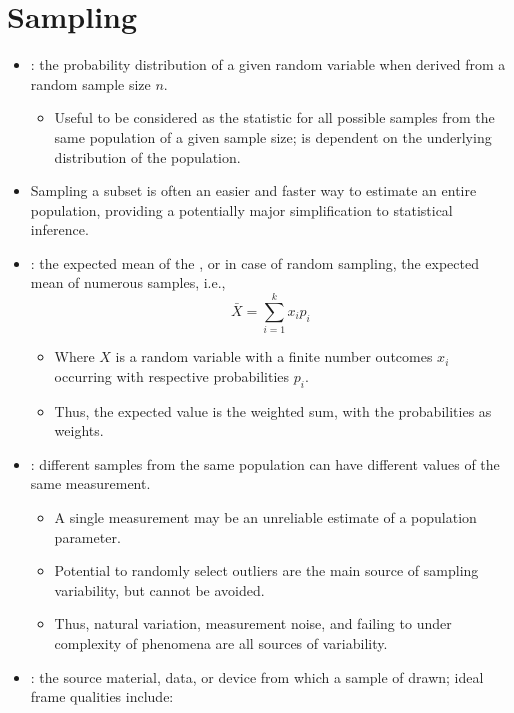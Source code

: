 \section{Sampling}
\begin{itemize}
  \item {}: the probability distribution of a given random variable when derived from a random sample size \(n\).
    \begin{itemize}
      \item Useful to be considered as the statistic for all possible samples from the same population of a given sample size; is dependent on the underlying distribution of the population.
    \end{itemize}
  \item Sampling a subset is often an easier and faster way to estimate an entire population, providing a potentially major simplification to statistical inference.
  \item {}: the expected mean of the \hyperref[Section: Data Fundamentals]{}, or in case of random sampling, the expected mean of numerous samples, i.e.,
  \[%
  \bar{X} = \sum_{i = 1}^{k}x_i p_i
  \]%
  \begin{itemize}
    \item Where \(X\) is a random variable with a finite number outcomes \(x_i\) occurring with respective probabilities \(p_i\).
    \item Thus, the expected value is the weighted sum, with the probabilities as weights.
  \end{itemize}
  \item {}: different samples from the same population can have different values of the same measurement.
  \begin{itemize}
      \item A single measurement may be an unreliable estimate of a population parameter.
      \item Potential to randomly select outliers are the main source of sampling variability, but cannot be avoided.
      \item Thus, natural variation, measurement noise, and failing to under complexity of phenomena are all sources of variability.
  \end{itemize}
  \item {}: the source material, data, or device from which a sample of drawn; ideal frame qualities include:

\end{itemize}
